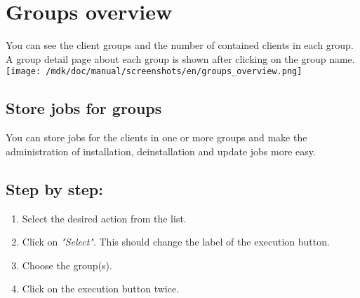 \section{Groups overview}You can see the client groups and the number of contained clients in each group. A group detail page about each group is shown after clicking on the group name.\\
\texttt{[image: /mdk/doc/manual/screenshots/en/groups\_overview.png]} \\
\subsection{Store jobs for groups}
You can store jobs for the clients in one or more groups and make the administration of installation, deinstallation and update jobs more easy.\\
\subsection{Step by step:}
\begin{enumerate}
\item Select the desired action from the list.\\
\item Click on \textit{"Select"}. This should change the label of the execution button.\\
\item Choose the group(s).\\
\item Click on the execution button twice.\\
\end{enumerate}
